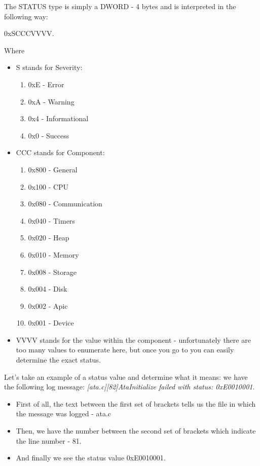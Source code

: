 \begin{appendices}
The STATUS type is simply a DWORD - 4 bytes and is interpreted in the following
way:

0x{\color{blue}S}{\color{purple}CCC}{\color{green}VVVV}.

Where

\begin{itemize}
	\item S stands for Severity:
		\begin{enumerate}
			\item 0xE - Error
			\item 0xA - Warning
			\item 0x4 - Informational
			\item 0x0 - Success
		\end{enumerate}

	\item CCC stands for Component:
		\begin{enumerate}
			\item 0x800 - General
			\item 0x100 - CPU
			\item 0x080 - Communication
			\item 0x040 - Timers
			\item 0x020 - Heap
			\item 0x010 - Memory
			\item 0x008 - Storage
			\item 0x004 - Disk
			\item 0x002 - Apic
			\item 0x001 - Device
		\end{enumerate}
		
	\item VVVV stands for the value within the component - unfortunately there are too many values
	to enumerate here, but once you go to  you can easily determine the exact status.
\end{itemize}

Let's take an example of a status value and determine what it means: we have the following
log message: \textit{[ata.c][82]AtaInitialize failed with status: 0xE0010001}.
\begin{itemize}
	\item First of all, the text between the first set of brackets tells us the file in which the
message was logged - ata.c
	\item Then, we have the number between the second set of brackets which indicate the line number
- 81.
	\item And finally we see the status value 0x{\color{blue}E}{\color{purple}001}{\color{green}0001}.


\end{itemize}
\end{appendices}
